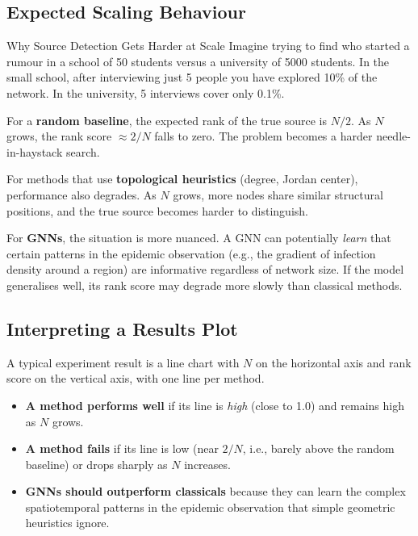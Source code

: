 \subsection{Expected Scaling Behaviour}

\begin{keyinsight}{Why Source Detection Gets Harder at Scale}
Imagine trying to find who started a rumour in a school of 50 students versus a university of 5000 students. In the small school, after interviewing just 5 people you have explored 10\% of the network. In the university, 5 interviews cover only 0.1\%.

For a \textbf{random baseline}, the expected rank of the true source is $N/2$. As $N$ grows, the rank score $\approx 2/N$ falls to zero. The problem becomes a harder needle-in-haystack search.

For methods that use \textbf{topological heuristics} (degree, Jordan center), performance also degrades. As $N$ grows, more nodes share similar structural positions, and the true source becomes harder to distinguish.

For \textbf{GNNs}, the situation is more nuanced. A GNN can potentially \emph{learn} that certain patterns in the epidemic observation (e.g., the gradient of infection density around a region) are informative regardless of network size. If the model generalises well, its rank score may degrade more slowly than classical methods.
\end{keyinsight}

\subsection{Interpreting a Results Plot}

A typical experiment result is a line chart with $N$ on the horizontal axis and rank score on the vertical axis, with one line per method.

\begin{itemize}
    \item \textbf{A method performs well} if its line is \emph{high} (close to 1.0) and remains high as $N$ grows.
    \item \textbf{A method fails} if its line is low (near $2/N$, i.e., barely above the random baseline) or drops sharply as $N$ increases.
    \item \textbf{GNNs should outperform classicals} because they can learn the complex spatiotemporal patterns in the epidemic observation that simple geometric heuristics ignore.
\end{itemize}


